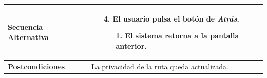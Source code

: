 \begin{longtable}{| p{4cm} | p{10cm} |}
\hline
\textbf{Secuencia Alternativa} &\mbox{}\par\vspace{-\baselineskip}
\begin{enumerate}[leftmargin=0.9cm, topsep=0.1cm]
\item[4.] El usuario pulsa el botón de \textit{Atrás}.
	\begin{itemize}
	\item[1.] El sistema retorna a la pantalla anterior.
	\end{itemize}
\end{enumerate}
\\

\hline
\textbf{Postcondiciones} & 
La privacidad de la ruta queda actualizada.\\
\hline
\end{longtable}



\newpage
